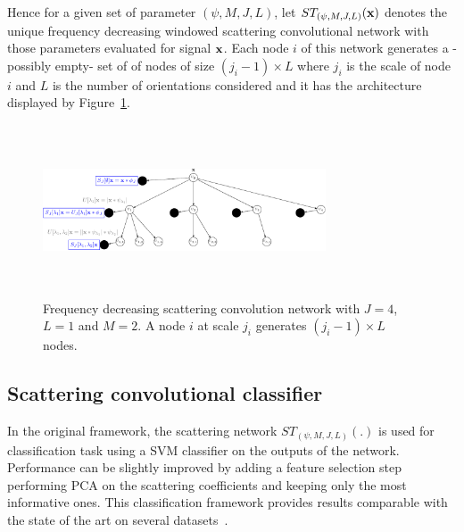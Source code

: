 \documentclass{article}
\begin{document}
    Hence for a given set of parameter $(\psi, M,J,L)$, let $ST_{(\psi, M,J,L)}({\bf x})$ denotes the unique frequency decreasing windowed scattering convolutional network with those parameters evaluated for signal ${\bf x}$. Each node $i$ of this network generates a -possibly empty- set of of nodes of size $(j_{i}-1) \times L$ where $j_{i}$ is the scale of node $i$ and $L$ is the number of orientations considered and it has the architecture displayed by Figure~\ref{fig:SCN 2}.

    \begin{figure}
      \begin{center}
        \includegraphics[width=3.3in, height=2in, keepaspectratio]{ST_freqDec_crop.pdf}
        \caption[Frequency decreasing scattering convolution network.]{\centering  Frequency decreasing scattering convolution network with $J=4$, $L=1$ and $M=2$. A node $i$ at scale $j_{i}$ generates $(j_{i}-1) \times L$ nodes. }
        \label{fig:SCN 2}
      \end{center}
      \vspace{-15pt}
    \end{figure}
    
  \subsection{Scattering convolutional classifier}
    \label{subsec:SCN/SCC}
  
		In the original framework, the scattering network $ST_{(\psi, M,J,L)}(.)$ is used for classification task using a SVM classifier on the outputs of the network. Performance can be slightly improved by adding a feature selection step performing PCA on the scattering coefficients and keeping only the most informative ones. This classification framework provides results comparable with the state of the art on several datasets~\citep{bruna}.
    
    


\end{document}
